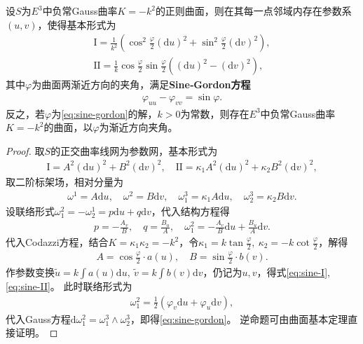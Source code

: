 \documentclass[../../main.tex]{subfiles}%
\begin{document}
\begin{proposition}
设$S$为$E^3$中负常Gauss曲率$K=-k^2$的正则曲面，则在其每一点邻域内存在参数系$(u,v)$，使得基本形式为
\begin{align}
\mathrm{I}=\frac{1}{k^2}\left(\cos^2\frac{\varphi}{2}(\mathrm{d}u)^2+\sin^2\frac{\varphi}{2}(\mathrm{d}v)^2\right),\label{eq:sine-I}\\
\mathrm{II}=\frac{1}{k}\cos\frac{\varphi}{2}\sin\frac{\varphi}{2}\left((\mathrm{d}u)^2-(\mathrm{d}v)^2\right),\label{eq:sine-II}
\end{align}
其中$\varphi$为曲面两渐近方向的夹角，满足\textbf{Sine‑Gordon方程}
\begin{align}
\varphi_{uu}-\varphi_{vv}=\sin\varphi.\label{eq:sine-gordon}
\end{align}
反之，若$\varphi$为\eqref{eq:sine-gordon}的解，$k>0$为常数，则存在$E^3$中负常Gauss曲率$K=-k^2$的曲面，以$\varphi$为渐近方向夹角。
\end{proposition}
\begin{proof}

取$S$的正交曲率线网为参数网，基本形式为
\begin{align*}
\mathrm{I}=A^2(\mathrm{d}u)^2+B^2(\mathrm{d}v)^2,\quad \mathrm{II}=\kappa_1A^2(\mathrm{d}u)^2+\kappa_2B^2(\mathrm{d}v)^2,
\end{align*}
取二阶标架场，相对分量为
\begin{align*}
\omega^1=A\mathrm{d}u,\quad \omega^2=B\mathrm{d}v,\quad \omega_1^3=\kappa_1A\mathrm{d}u,\quad \omega_2^3=\kappa_2B\mathrm{d}v.
\end{align*}
设联络形式$\omega_1^2=-\omega_2^1=p\mathrm{d}u+q\mathrm{d}v$，代入结构方程得
\begin{align*}
p=-\frac{A_v}{B},\quad q=\frac{B_u}{A},\quad \omega_1^2=-\frac{A_v}{B}\mathrm{d}u+\frac{B_u}{A}\mathrm{d}v.
\end{align*}
代入Codazzi方程，结合$K=\kappa_1\kappa_2=-k^2$，令$\kappa_1=k\tan\frac{\varphi}{2},\ \kappa_2=-k\cot\frac{\varphi}{2}$，解得
\begin{align*}
A=\cos\frac{\varphi}{2}\cdot a(u),\quad B=\sin\frac{\varphi}{2}\cdot b(v).
\end{align*}
作参数变换$\tilde{u}=k\int a(u)\mathrm{d}u,\ \tilde{v}=k\int b(v)\mathrm{d}v$，仍记为$u,v$，得式\eqref{eq:sine-I},\eqref{eq:sine-II}。
此时联络形式为
\begin{align*}
\omega_1^2=\frac{1}{2}(\varphi_v\mathrm{d}u+\varphi_u\mathrm{d}v),
\end{align*}
代入Gauss方程$\mathrm{d}\omega_1^2=\omega_1^3\wedge\omega_2^3$，即得\eqref{eq:sine-gordon}。
逆命题可由曲面基本定理直接证明。

\end{proof}
\end{document}
